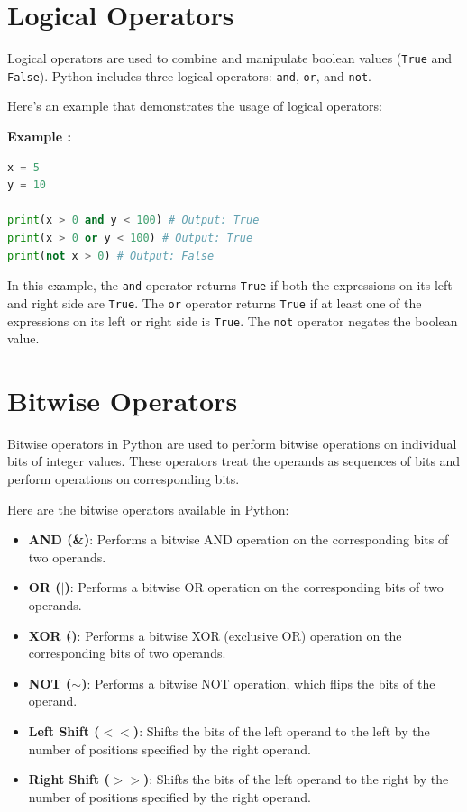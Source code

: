 \documentclass[12pt]{book}
\newtheorem{Example}{Example}[chapter]
\renewenvironment{Example}{\begin{trivlist}\item\relax
\textbf{Example \thesection: }}{\end{trivlist}}
\begin{document}
\section{Logical Operators}

Logical operators are used to combine and manipulate boolean values (\texttt{True} and \texttt{False}). Python includes three logical operators: \texttt{and}, \texttt{or}, and \texttt{not}.

Here's an example that demonstrates the usage of logical operators:

\begin{Example}
\begin{lstlisting}[language=Python]
x = 5
y = 10

print(x > 0 and y < 100) # Output: True
print(x > 0 or y < 100) # Output: True
print(not x > 0) # Output: False
\end{lstlisting}
\end{Example}

In this example, the \texttt{and} operator returns \texttt{True} if both the expressions on its left and right side are \texttt{True}. The \texttt{or} operator returns \texttt{True} if at least one of the expressions on its left or right side is \texttt{True}. The \texttt{not} operator negates the boolean value.


\section{Bitwise Operators}

Bitwise operators in Python are used to perform bitwise operations on individual bits of integer values. These operators treat the operands as sequences of bits and perform operations on corresponding bits.

Here are the bitwise operators available in Python:

\begin{itemize}
\item \textbf{AND (&)}: Performs a bitwise AND operation on the corresponding bits of two operands.
\item \textbf{OR ($|$)}: Performs a bitwise OR operation on the corresponding bits of two operands.
\item \textbf{XOR ($\hat{}$)}: Performs a bitwise XOR (exclusive OR) operation on the corresponding bits of two operands.
\item \textbf{NOT ($\sim$)}: Performs a bitwise NOT operation, which flips the bits of the operand.
\item \textbf{Left Shift ($<<$)}: Shifts the bits of the left operand to the left by the number of positions specified by the right operand.
\item \textbf{Right Shift ($>>$)}: Shifts the bits of the left operand to the right by the number of positions specified by the right operand.
\end{itemize}
\end{document}
